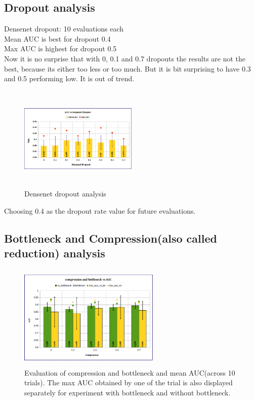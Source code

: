 \subsection{Dropout analysis}
Densenet dropout: 10 evaluations each \\
Mean AUC is best for dropout 0.4\\
Max AUC is highest for dropout 0.5\\
Now it is no surprise that with 0, 0.1 and 0.7 dropouts the results are not the best, because its either too less or too much. But it is bit surprising to have 0.3 and 0.5 performing low. It is out of trend. 

\begin{figure}[ht]
\centering
\includegraphics[height=5cm,width=0.5\textwidth]{images/densenet/auc_vs_densenet_dropout}
\caption{Densenet dropout analysis}
\label{fig:auc_vs_densenet_dropout}
\end{figure}
Choosing 0.4 as the dropout rate value for future evaluations.

\subsection{Bottleneck and Compression(also called reduction) analysis}

\begin{figure}[ht]
\centering
\includegraphics[height=5cm,width=0.6\textwidth]{images/densenet/compression_and_bottleneck_vs_auc}
\caption{Evaluation of compression and bottleneck and mean AUC(across 10 trials). The max AUC obtained by one of the trial is also displayed separately for experiment with bottleneck and without bottleneck.}
\label{fig:compression_and_bottleneck_vs_auc}
\end{figure}

